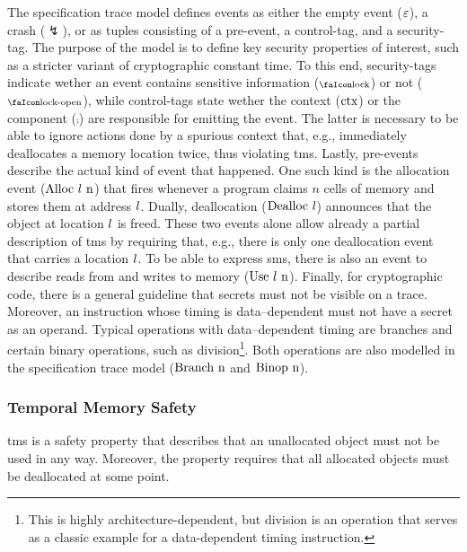 \documentclass[utf8,acmsmall,review,screen,dvipsnames]{acmart}
\begin{document}
The specification trace model defines events as either the empty event ($\varepsilon$), a crash ($\lightning$), or as tuples consisting of a pre-event, a control-tag, and a security-tag.
The purpose of the model is to define key security properties of interest, such as  a stricter variant of cryptographic constant time.
To this end, security-tags indicate wether an event contains sensitive information ($\lock$) or not ($\unlock$), while control-tags state wether the context ($\text{ctx}$) or the component ($\comp$) are responsible for emitting the event.
The latter is necessary to be able to ignore actions done by a spurious context that, e.g., immediately deallocates a memory location twice, thus violating \gls{tms}. 
Lastly, pre-events describe the actual kind of event that happened.
One such kind is the allocation event ($\ev{Alloc\ \loc\ n}$) that fires whenever a program claims $n$ cells of memory and stores them at address $l$.
Dually, deallocation ($\text{Dealloc\ \ensuremath l}$) announces that the object at location $l$ is freed.
These two events alone allow already a partial description of \gls{tms} by requiring that, e.g., there is only one deallocation event that carries a location $l$.
To be able to express \gls{sms}, there is also an event to describe reads from and writes to memory ($\text{Use\ \ensuremath l\ n}$).
Finally, for cryptographic code, there is a general guideline that secrets must not be visible on a trace.
Moreover, an instruction whose timing is data--dependent must not have a secret as an operand.
Typical operations with data--dependent timing are branches and certain binary operations, such as division\footnote{This is highly architecture-dependent, but division is an operation that serves as a classic example for a data-dependent timing instruction.}.
Both operations are also modelled in the specification trace model ($\ev{Branch\ n}$ and $\text{Binop\ n}$).

\subsubsection{Temporal Memory Safety}

\gls{tms} is a safety property that describes that an unallocated object must not be used in any way.
Moreover, the property requires that all allocated objects must be deallocated at some point.
\end{document}
